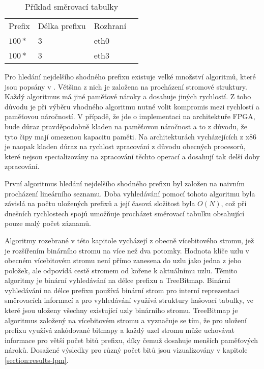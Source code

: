 \begin{table}[!htbp]
	\center
    \begin{tabular}{|l|l|l|l|}
    \hline
    Prefix & Délka prefixu & Rozhraní \\ \hhline{|=|=|=|=|}
    $100*$ & 3 & eth0 \\ \hline
    $100*$ & 3 & eth3 \\ \hline
    \end{tabular}
    \caption{Příklad směrovací tabulky}
\end{table}

Pro hledání nejdelšího shodného prefixu existuje velké množství algoritmů, které jsou popsány v \cite{tbm}.
Většina z nich je založena na procházení stromové struktury. Každý algoritmus má jiné paměťové nároky
a dosahuje jiných rychlostí. Z toho důvodu je při výběru vhodného algoritmu nutné
volit kompromis mezi rychlostí a paměťovou náročností.
V případě, že jde o implementaci na architektuře FPGA, bude důraz pravděpodobně kladen na paměťovou náročnost
a to z důvodu, že tyto čipy mají omezenou kapacitu paměti. Na architekturách vycházejících z x86 je naopak kladen důraz
na rychlost zpracování z důvodu obecných procesorů, které nejsou specializovány na zpracování těchto operací
a dosahují tak delší doby zpracování.

První algoritmus hledání nejdelšího shodného prefixu byl založen na naivním procházení lineárního
seznamu. Doba vyhledávání pomocí tohoto algoritmu byla závislá na počtu uložených prefixů a její
časová složitost byla $O(N)$, což při dnešních rychlostech spojů umožňuje procházet směrovací tabulku
obsahující pouze malý počet záznamů.

Algoritmy rozebrané v této kapitole vycházejí z obecně vícebitového stromu,
jež je rozšířením binárního stromu na více než dva potomky.
Hodnota klíče uzlu v obecném vícebitovém stromu není přímo zanesena do uzlu jako jedna z jeho položek,
ale odpovídá cestě stromem od kořene k aktuálnímu uzlu.
Těmito algoritmy je binární vyhledávání na délce prefixu a TreeBitmap.
Binární vyhledávání na délce prefixu používá binární strom pro interní reprezentaci směrovacích
informací a pro vyhledávání využívá struktury hašovací tabulky, ve které jsou uloženy všechny existující uzly
binárního stromu.
TreeBitmap je algoritmus založený na vícebitovém stromu a vyznačuje se tím,
že pro uložení prefixu využívá zakódované bitmapy a každý uzel stromu může uchovávat informace pro větší počet bitů prefixu, díky čemuž dosahuje menších paměťových nároků.
Dosažené výsledky pro různý počet bitů jsou vizualizovány v kapitole \ref{section:results-lpm}.


